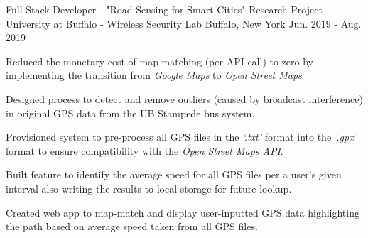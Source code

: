 

\begin{cventries}

  \cventry
    {Full Stack Developer - "Road Sensing for Smart Cities" Research Project} %
    {University at Buffalo - Wireless Security Lab} %
    {Buffalo, New York} %
    {Jun. 2019 - Aug. 2019} %
    {
      \begin{cvitems} %
        \item {Reduced the monetary cost of map matching (per API call) to zero by implementing the transition from \textit{Google Maps} to \textit{Open Street Maps}}
        \item {Designed process to detect and remove outliers (caused by broadcast interference) in original GPS data from the UB Stampede bus system.}
        \item {Provisioned system to pre-process all GPS files in the \textit{‘.txt’} format into the \textit{‘.gpx’} format to ensure compatibility with the \textit{Open Street Maps API}.}
        \item {Built feature to identify the average speed for all GPS files per a user's given interval also writing the results to local storage for future lookup.}
        \item {Created web app to map-match and display user-inputted GPS data highlighting the path based on average speed taken from all GPS files.}
      \end{cvitems}
    }
    

\end{cventries}